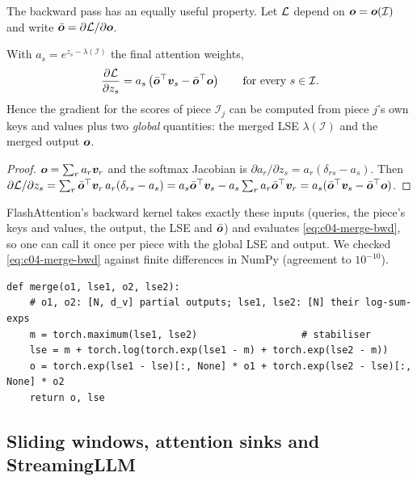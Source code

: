 The backward pass has an equally useful property. Let $\mathcal{L}$ depend on $\bm{o}=\bm{o}(\mathcal{I})$
and write $\bar{\bm{o}}=\partial\mathcal{L}/\partial\bm{o}$.

\begin{proposition}\label{prop:c04-merge-bwd}
With $a_s=e^{z_s-\lambda(\mathcal{I})}$ the final attention weights,
\begin{equation}\label{eq:c04-merge-bwd}
  \frac{\partial\mathcal{L}}{\partial z_s} = a_s\left(\bar{\bm{o}}^{\top}\bm{v}_s - \bar{\bm{o}}^{\top}\bm{o}\right)
  \qquad\text{for every } s\in\mathcal{I}.
\end{equation}
Hence the gradient for the scores of piece $\mathcal{I}_j$ can be computed from piece $j$'s own
keys and values plus two \emph{global} quantities: the merged LSE $\lambda(\mathcal{I})$ and the
merged output $\bm{o}$.
\end{proposition}
\begin{proof}
$\bm{o}=\sum_r a_r\bm{v}_r$ and the softmax Jacobian is $\partial a_r/\partial z_s=a_r(\delta_{rs}-a_s)$.
Then $\partial\mathcal{L}/\partial z_s=\sum_r\bar{\bm{o}}^{\top}\bm{v}_r\,a_r(\delta_{rs}-a_s)
=a_s\bar{\bm{o}}^{\top}\bm{v}_s-a_s\sum_ra_r\bar{\bm{o}}^{\top}\bm{v}_r=a_s(\bar{\bm{o}}^{\top}\bm{v}_s-\bar{\bm{o}}^{\top}\bm{o})$.
\end{proof}

FlashAttention's backward kernel takes exactly these inputs (queries, the piece's keys and
values, the output, the LSE and $\bar{\bm{o}}$) and evaluates \eqref{eq:c04-merge-bwd}, so one
can call it once per piece with the global LSE and output. We checked
\eqref{eq:c04-merge-bwd} against finite differences in NumPy (agreement to $10^{-10}$).

\begin{lstlisting}[caption={Reference implementation (ours): merging two attention pieces by log-sum-exp.},label={lst:c04-merge}]
def merge(o1, lse1, o2, lse2):
    # o1, o2: [N, d_v] partial outputs; lse1, lse2: [N] their log-sum-exps
    m = torch.maximum(lse1, lse2)                  # stabiliser
    lse = m + torch.log(torch.exp(lse1 - m) + torch.exp(lse2 - m))
    o = torch.exp(lse1 - lse)[:, None] * o1 + torch.exp(lse2 - lse)[:, None] * o2
    return o, lse
\end{lstlisting}

\subsection{Sliding windows, attention sinks and StreamingLLM}\label{sec:c04-streaming}

